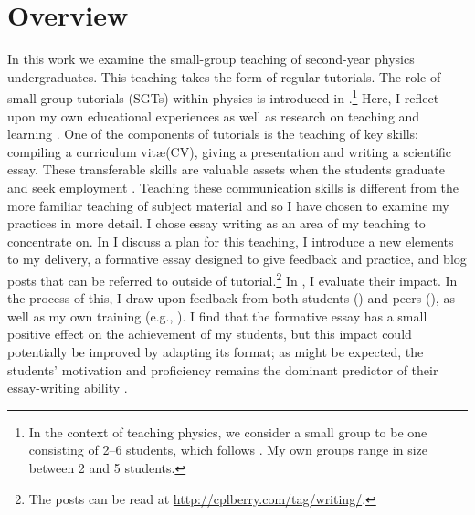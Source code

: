 \chapter{Overview}

In this work we examine the small-group teaching of second-year physics undergraduates. This teaching takes the form of regular tutorials. The role of small-group tutorials (SGTs) within physics is introduced in .\footnote{In the context of teaching physics, we consider a small group to be one consisting of 2--6 students, which follows \citet[chapter 1]{Jaques2007}. My own groups range in size between 2 and 5 students.} Here, I reflect upon my own educational experiences as well as research on teaching and learning \citep{McCarthy2008}. One of the components of tutorials is the teaching of key skills: compiling a curriculum vit\ae (CV), giving a presentation and writing a scientific essay. These transferable skills are valuable assets when the students graduate and seek employment \citep{Pike2015}. Teaching these communication skills is different from the more familiar teaching of subject material and so I have chosen to examine my practices in more detail. I chose essay writing as an area of my teaching to concentrate on. In  I discuss a plan for this teaching, I introduce a new elements to my delivery, a formative essay designed to give feedback \citep[feedforward;][]{Bloxham2015} and practice, and blog posts that can be referred to outside of tutorial.\footnote{The posts can be read at \url{http://cplberry.com/tag/writing/}.} In , I evaluate their impact. In the process of this, I draw upon feedback from both students () and peers (), as well as my own training (e.g., ). I find that the formative essay has a small positive effect on the achievement of my students, but this impact could potentially be improved by adapting its format; as might be expected, the students' motivation and proficiency remains the dominant predictor of their essay-writing ability \citep{Ketteridge2015}.
